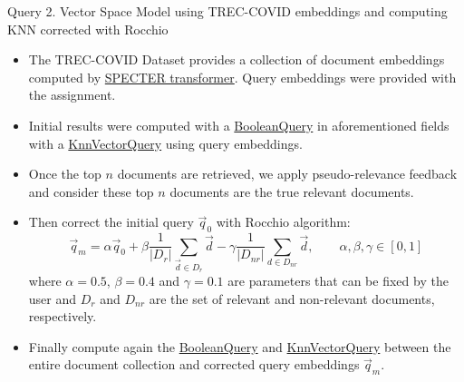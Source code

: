 \documentclass[10pt]{beamer}
\begin{document}
{\begin{frame}{Query 2. Vector Space Model using TREC-COVID embeddings and computing KNN corrected with Rocchio \cite{salton1990improving}}
    \begin{itemize}
        \item The TREC-COVID Dataset provides a collection of document embeddings computed by \href{https://arxiv.org/abs/2004.07180}{SPECTER transformer}. Query embeddings were provided with the assignment. 
        \item Initial results were computed with a \href{https://lucene.apache.org/core/8_9_0/core/org/apache/lucene/search/BooleanQuery.html}{BooleanQuery} in aforementioned fields with a \href{https://lucene.apache.org/core/9_0_0/core/org/apache/lucene/search/KnnVectorQuery.html}{KnnVectorQuery} using query embeddings.
        \item Once the top $n$ documents are retrieved, we apply pseudo-relevance feedback and consider these top $n$ documents are the true relevant documents.
        \item Then correct the initial query $\vec{q}_0$ with Rocchio algorithm:
        \[ \vec{q}_m = \alpha \vec{q}_0 + \beta \frac{1}{|D_r|} \sum_{\vec{d}\in D_r}\vec{d} - \gamma \frac{1}{|D_{nr}|} \sum_{d\in D_{nr}} \vec{d}, \qquad \alpha, \beta, \gamma \in [0,1]\]
        where $\alpha=0.5$, $\beta=0.4$ and $\gamma=0.1$ are parameters that can be fixed by the user and $D_r$ and $D_{nr}$ are the set of relevant and non-relevant documents, respectively.
        \item Finally compute again the \href{https://lucene.apache.org/core/8_9_0/core/org/apache/lucene/search/BooleanQuery.html}{BooleanQuery} and \href{https://lucene.apache.org/core/9_0_0/core/org/apache/lucene/search/KnnVectorQuery.html}{KnnVectorQuery} between the entire document collection and corrected query embeddings $\vec{q}_m$.
    \end{itemize}
\end{frame}

}
\end{document}
